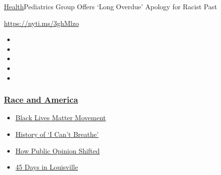 \href{/section/health}{Health}\textbar{}Pediatrics Group Offers `Long
Overdue' Apology for Racist Past

\url{https://nyti.ms/3ghMlzo}

\begin{itemize}
\item
\item
\item
\item
\item
\end{itemize}

\hypertarget{race-and-america}{%
\subsubsection{\texorpdfstring{\href{https://www.nytimes3xbfgragh.onion/news-event/george-floyd-protests-minneapolis-new-york-los-angeles?name=styln-george-floyd\&region=TOP_BANNER\&variant=undefined\&block=storyline_menu_recirc\&action=click\&pgtype=Article\&impression_id=0a9fe590-e388-11ea-bc3e-7712c2f37c01}{Race
and America}}{Race and America}}\label{race-and-america}}

\begin{itemize}
\tightlist
\item
  \href{https://www.nytimes3xbfgragh.onion/interactive/2020/07/03/us/george-floyd-protests-crowd-size.html?name=styln-george-floyd\&region=TOP_BANNER\&variant=undefined\&block=storyline_menu_recirc\&action=click\&pgtype=Article\&impression_id=0a9fe591-e388-11ea-bc3e-7712c2f37c01}{Black
  Lives Matter Movement}
\item
  \href{https://www.nytimes3xbfgragh.onion/interactive/2020/06/28/us/i-cant-breathe-police-arrest.html?name=styln-george-floyd\&region=TOP_BANNER\&variant=undefined\&block=storyline_menu_recirc\&action=click\&pgtype=Article\&impression_id=0a9fe592-e388-11ea-bc3e-7712c2f37c01}{History
  of `I Can't Breathe'}
\item
  \href{https://www.nytimes3xbfgragh.onion/interactive/2020/06/10/upshot/black-lives-matter-attitudes.html?name=styln-george-floyd\&region=TOP_BANNER\&variant=undefined\&block=storyline_menu_recirc\&action=click\&pgtype=Article\&impression_id=0a9fe593-e388-11ea-bc3e-7712c2f37c01}{How
  Public Opinion Shifted}
\item
  \href{https://www.nytimes3xbfgragh.onion/interactive/2020/07/16/us/black-lives-matter-protests-louisville-breonna-taylor.html?name=styln-george-floyd\&region=TOP_BANNER\&variant=undefined\&block=storyline_menu_recirc\&action=click\&pgtype=Article\&impression_id=0a9fe594-e388-11ea-bc3e-7712c2f37c01}{45
  Days in Louisville}
\end{itemize}

